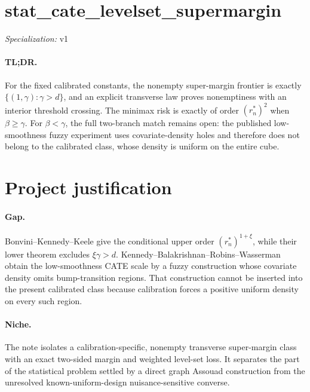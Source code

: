\documentclass{article}
\begin{document}
\sloppy

\section*{stat\_\allowbreak{}cate\_\allowbreak{}levelset\_\allowbreak{}supermargin}

\noindent\textit{Specialization:} v1\par

\paragraph{TL;DR.} For the fixed calibrated constants, the nonempty super-margin frontier is exactly \(\{(1,\gamma):\gamma>d\}\), and an explicit transverse law proves nonemptiness with an interior threshold crossing. The minimax risk is exactly of order \((r_n^*)^2\) when \(\beta\ge\gamma\). For \(\beta<\gamma\), the full two-branch match remains open: the published low-smoothness fuzzy experiment uses covariate-density holes and therefore does not belong to the calibrated class, whose density is uniform on the entire cube.

\section{Project justification}

\paragraph{Gap.} Bonvini--Kennedy--Keele give the conditional upper order \((r_n^*)^{1+\xi}\), while their lower theorem excludes \(\xi\gamma>d\). Kennedy--Balakrishnan--Robins--Wasserman obtain the low-smoothness CATE scale by a fuzzy construction whose covariate density omits bump-transition regions. That construction cannot be inserted into the present calibrated class because calibration forces a positive uniform density on every such region.

\paragraph{Niche.} The note isolates a calibration-specific, nonempty transverse super-margin class with an exact two-sided margin and weighted level-set loss. It separates the part of the statistical problem settled by a direct graph Assouad construction from the unresolved known-uniform-design nuisance-sensitive converse.
\end{document}
